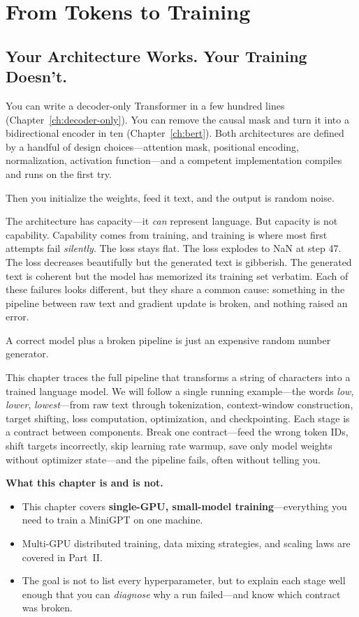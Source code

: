 \chapter[From Tokens to Training]{From Tokens to Training}
\label{ch:tokens-to-training}

\section{Your Architecture Works. Your Training Doesn't.}

You can write a decoder-only Transformer in a few hundred lines (Chapter~\ref{ch:decoder-only}). You can remove the causal mask and turn it into a bidirectional encoder in ten (Chapter~\ref{ch:bert}). Both architectures are defined by a handful of design choices---attention mask, positional encoding, normalization, activation function---and a competent implementation compiles and runs on the first try.

Then you initialize the weights, feed it text, and the output is random noise.

The architecture has capacity---it \emph{can} represent language. But capacity is not capability. Capability comes from training, and training is where most first attempts fail \emph{silently}. The loss stays flat. The loss explodes to NaN at step 47. The loss decreases beautifully but the generated text is gibberish. The generated text is coherent but the model has memorized its training set verbatim. Each of these failures looks different, but they share a common cause: something in the pipeline between raw text and gradient update is broken, and nothing raised an error.

A correct model plus a broken pipeline is just an expensive random number generator.

This chapter traces the full pipeline that transforms a string of characters into a trained language model. We will follow a single running example---the words \emph{low}, \emph{lower}, \emph{lowest}---from raw text through tokenization, context-window construction, target shifting, loss computation, optimization, and checkpointing. Each stage is a contract between components. Break one contract---feed the wrong token IDs, shift targets incorrectly, skip learning rate warmup, save only model weights without optimizer state---and the pipeline fails, often without telling you.

\begin{quickrecap}
\textbf{What this chapter is and is not.}
\begin{itemize}[nosep,leftmargin=1.5em]
  \item This chapter covers \textbf{single-GPU, small-model training}---everything you need to train a MiniGPT on one machine.
  \item Multi-GPU distributed training, data mixing strategies, and scaling laws are covered in Part~II.
  \item The goal is not to list every hyperparameter, but to explain each stage well enough that you can \emph{diagnose} why a run failed---and know which contract was broken.
\end{itemize}
\end{quickrecap}


